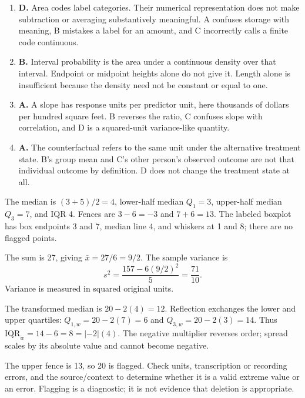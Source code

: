 \documentclass[11pt]{article}
\begin{document}
\begin{enumerate}[label=\textbf{\arabic*.}]
\item \textbf{D.} Area codes label categories. Their numerical representation does not make subtraction or averaging substantively meaningful. A confuses storage with meaning, B mistakes a label for an amount, and C incorrectly calls a finite code continuous.
\item \textbf{B.} Interval probability is the area under a continuous density over that interval. Endpoint or midpoint heights alone do not give it. Length alone is insufficient because the density need not be constant or equal to one.
\item \textbf{A.} A slope has response units per predictor unit, here thousands of dollars per hundred square feet. B reverses the ratio, C confuses slope with correlation, and D is a squared-unit variance-like quantity.
\item \textbf{A.} The counterfactual refers to the same unit under the alternative treatment state. B's group mean and C's other person's observed outcome are not that individual outcome by definition. D does not change the treatment state at all.
\end{enumerate}

\begin{parts}
\item The median is $(3+5)/2=4$, lower-half median $Q_1=3$, upper-half median $Q_3=7$, and IQR 4. Fences are $3-6=-3$ and $7+6=13$. The labeled boxplot has box endpoints 3 and 7, median line 4, and whiskers at 1 and 8; there are no flagged points.
\item The sum is 27, giving $\bar x=27/6=9/2$. The sample variance is
\[s^2=\frac{157-6(9/2)^2}{5}=\frac{71}{10}.\]
Variance is measured in squared original units.
\item The transformed median is $20-2(4)=12$. Reflection exchanges the lower and upper quartiles: $Q_{1,w}=20-2(7)=6$ and $Q_{3,w}=20-2(3)=14$. Thus $\mathrm{IQR}_w=14-6=8=|-2|(4)$. The negative multiplier reverses order; spread scales by its absolute value and cannot become negative.
\item The upper fence is 13, so 20 is flagged. Check units, transcription or recording errors, and the source/context to determine whether it is a valid extreme value or an error. Flagging is a diagnostic; it is not evidence that deletion is appropriate.
\end{parts}
\end{document}
